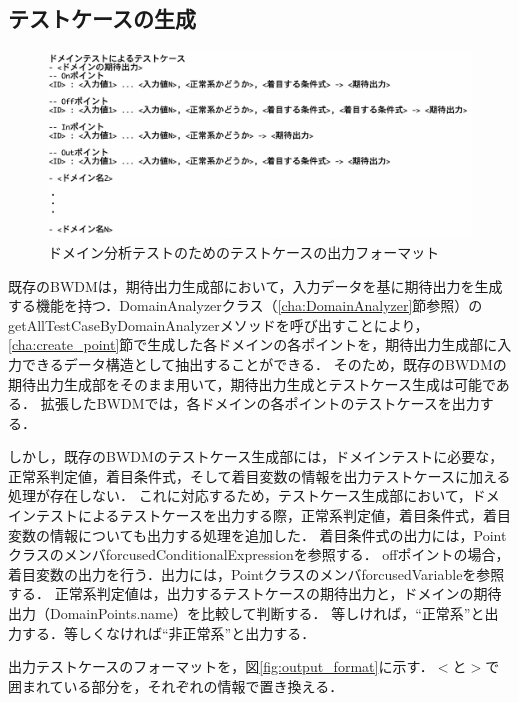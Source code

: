 \documentclass[uplatex, report, a4j, 10pt]{jsbook}
\begin{document}
\subsection{テストケースの生成}
\begin{figure}[tp]
  \centering
  \includegraphics[keepaspectratio, width=160mm]{figs/dmin_output_format}
  \caption{ドメイン分析テストのためのテストケースの出力フォーマット}
  \label{fig:dmin_output_format}
\end{figure}

既存のBWDMは，期待出力生成部において，入力データを基に期待出力を生成する機能を持つ．DomainAnalyzerクラス（\ref{cha:DomainAnalyzer}節参照）のgetAllTestCaseByDomainAnalyzerメソッドを呼び出すことにより，\ref{cha:create_point}節で生成した各ドメインの各ポイントを，期待出力生成部に入力できるデータ構造として抽出することができる．
そのため，既存のBWDMの期待出力生成部をそのまま用いて，期待出力生成とテストケース生成は可能である．
拡張したBWDMでは，各ドメインの各ポイントのテストケースを出力する．

しかし，既存のBWDMのテストケース生成部には，ドメインテストに必要な，正常系判定値，着目条件式，そして着目変数の情報を出力テストケースに加える処理が存在しない．
これに対応するため，テストケース生成部において，ドメインテストによるテストケースを出力する際，正常系判定値，着目条件式，着目変数の情報についても出力する処理を追加した．
着目条件式の出力には，PointクラスのメンバforcusedConditionalExpressionを参照する．
offポイントの場合，着目変数の出力を行う．出力には，PointクラスのメンバforcusedVariableを参照する．
正常系判定値は，出力するテストケースの期待出力と，ドメインの期待出力（DomainPoints.name）を比較して判断する．
等しければ，“正常系”と出力する．等しくなければ“非正常系”と出力する．

出力テストケースのフォーマットを，図\ref{fig:output_format}に示す．$<$と$>$で囲まれている部分を，それぞれの情報で置き換える．
\end{document}
